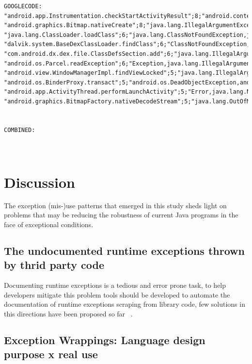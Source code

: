 \documentclass[conference]{IEEEtran}
\begin{document}
{\begin{verbatim}
GOOGLECODE:
"android.app.Instrumentation.checkStartActivityResult";8;"android.content.ActivityNotFoundException"
"android.graphics.Bitmap.nativeCreate";8;"java.lang.IllegalArgumentException,java.lang.OutOfMemoryError,java.lang.RuntimeException"
"java.lang.ClassLoader.loadClass";6;"java.lang.ClassNotFoundException,java.lang.IncompatibleClassChangeError,java.lang.UnsupportedClassVersionError"
"dalvik.system.BaseDexClassLoader.findClass";6;"ClassNotFoundException,java.lang.ClassNotFoundException"
"com.android.dx.dex.file.ClassDefsSection.add";6;"java.lang.IllegalArgumentException"
"android.os.Parcel.readException";6;"Exception,java.lang.IllegalArgumentException,java.lang.IllegalStateException,java.lang.NullPointerException,java.lang.SecurityException"
"android.view.WindowManagerImpl.findViewLocked";5;"java.lang.IllegalArgumentException"
"android.os.BinderProxy.transact";5;"android.os.DeadObjectException,android.os.RemoteException,android.os.TransactionTooLargeException,java.lang.RuntimeException,java.lang.SecurityException"
"android.app.ActivityThread.performLaunchActivity";5;"Error,java.lang.NullPointerException,java.lang.RuntimeException"
"android.graphics.BitmapFactory.nativeDecodeStream";5;"java.lang.OutOfMemoryError"


COMBINED:



\end{verbatim}
}

\section{Discussion}

The exception (mis-)use patterns that emerged  in this study sheds light on 
problems that may be reducing the robustness of current Java programs in the face of
exceptional conditions. 

\subsection{The undocumented runtime exceptions thrown by thrid party code} 
Documenting runtime exceptions is a tedious and error prone task, to help developers
mitigate this problem tools should be developed to automate the documentation of runtime exceptions
scraping from library code, few solutions in this directions have been proposed so far ~\cite{van2005combining}. 

\subsection{Exception Wrappings: Language design purpose x real use}
\end{document}

